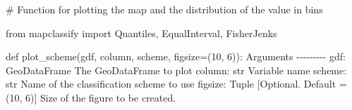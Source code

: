\documentclass[
  letterpaper,
  DIV=11,
  numbers=noendperiod]{scrreprt}
\newenvironment{Shaded}{\begin{snugshade}}{\end{snugshade}}
\newcommand{\CommentTok}[1]{\textcolor[rgb]{0.37,0.37,0.37}{#1}}
\newcommand{\DecValTok}[1]{\textcolor[rgb]{0.68,0.00,0.00}{#1}}
\newcommand{\ImportTok}[1]{\textcolor[rgb]{0.00,0.46,0.62}{#1}}
\newcommand{\KeywordTok}[1]{\textcolor[rgb]{0.00,0.23,0.31}{#1}}
\newcommand{\NormalTok}[1]{\textcolor[rgb]{0.00,0.23,0.31}{#1}}
\newcommand{\OperatorTok}[1]{\textcolor[rgb]{0.37,0.37,0.37}{#1}}
\begin{document}
\begin{Shaded}
\begin{Highlighting}[]
\CommentTok{\# Function for plotting the map and the distribution of the value in bins  }

\ImportTok{from}\NormalTok{ mapclassify }\ImportTok{import}\NormalTok{ Quantiles, EqualInterval, FisherJenks}

\KeywordTok{def}\NormalTok{ plot\_scheme(gdf, column, scheme, figsize}\OperatorTok{=}\NormalTok{(}\DecValTok{10}\NormalTok{, }\DecValTok{6}\NormalTok{)):}
    \CommentTok{\textquotesingle{}\textquotesingle{}\textquotesingle{}}
\CommentTok{    Arguments}
\CommentTok{    {-}{-}{-}{-}{-}{-}{-}{-}{-}}
\CommentTok{    gdf: GeoDataFrame}
\CommentTok{        The GeoDataFrame to plot}
\CommentTok{    column: str}
\CommentTok{        Variable name }
\CommentTok{    scheme: str}
\CommentTok{        Name of the classification scheme to use }
\CommentTok{    figsize: Tuple}
\CommentTok{        [Optional. Default = (10, 6)] Size of the figure to be created.}


\end{Highlighting}
\end{Shaded}
\end{document}
